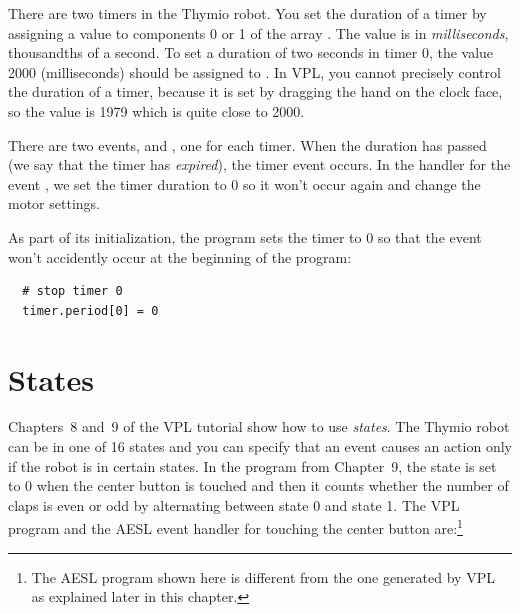\documentclass[11pt,a4paper,english]{report}
\begin{document}
There are two timers in the Thymio robot. You set the duration of a
timer by assigning a value to components 0 or 1 of the array
. The value is in \emph{milliseconds}, thousandths of a
second. To set a duration of two seconds in timer 0, the value 2000
(milliseconds) should be assigned to . In VPL, you
cannot precisely control the duration of a timer, because it is set by
dragging the hand on the clock face, so the value is 1979 which is quite
close to 2000.

There are two events,  and , one for each timer.
When the duration has passed (we say that the timer has \emph{expired}),
the timer event occurs. In the handler for the event , we set
the timer duration to 0 so it won't occur again and change the motor
settings.

As part of its initialization, the program sets the timer to 0 so that
the event won't accidently occur at the beginning of the program:

\begin{footnotesize}
\begin{verbatim}
  # stop timer 0
  timer.period[0] = 0
\end{verbatim}
\end{footnotesize}


\chapter{States}

Chapters~8 and~9 of the VPL tutorial show how to use \emph{states}. The
Thymio robot can be in one of 16 states and you can specify that an
event causes an action only if the robot is in certain states. In the
program  from Chapter~9, the state is set to 0 when
the center button is touched and then it counts whether the number of
claps is even or odd by alternating between state 0 and state 1. The VPL
program and the AESL event handler for touching the center button
are:\footnote{The AESL program shown here is different from the one
generated by VPL as explained later in this chapter.}
\end{document}
